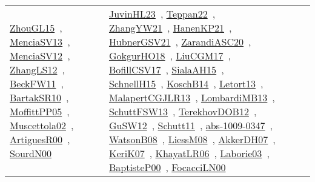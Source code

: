 {\begin{longtable}{lp{3cm}>{\raggedright\arraybackslash}p{6cm}>{\raggedright\arraybackslash}p{6cm}>{\raggedright\arraybackslash}p{8cm}}
\href{works/ZhouGL15.pdf}{ZhouGL15}~\cite{ZhouGL15}, \href{works/MenciaSV13.pdf}{MenciaSV13}~\cite{MenciaSV13}, \href{works/MenciaSV12.pdf}{MenciaSV12}~\cite{MenciaSV12}, \href{works/ZhangLS12.pdf}{ZhangLS12}~\cite{ZhangLS12}, \href{works/BeckFW11.pdf}{BeckFW11}~\cite{BeckFW11}, \href{works/BartakSR10.pdf}{BartakSR10}~\cite{BartakSR10}, \href{works/MoffittPP05.pdf}{MoffittPP05}~\cite{MoffittPP05}, \href{works/Muscettola02.pdf}{Muscettola02}~\cite{Muscettola02}, \href{works/ArtiguesR00.pdf}{ArtiguesR00}~\cite{ArtiguesR00}, \href{works/SourdN00.pdf}{SourdN00}~\cite{SourdN00} & \href{works/JuvinHL23.pdf}{JuvinHL23}~\cite{JuvinHL23}, \href{works/Teppan22.pdf}{Teppan22}~\cite{Teppan22}, \href{works/ZhangYW21.pdf}{ZhangYW21}~\cite{ZhangYW21}, \href{works/HanenKP21.pdf}{HanenKP21}~\cite{HanenKP21}, \href{works/HubnerGSV21.pdf}{HubnerGSV21}~\cite{HubnerGSV21}, \href{works/ZarandiASC20.pdf}{ZarandiASC20}~\cite{ZarandiASC20}, \href{works/GokgurHO18.pdf}{GokgurHO18}~\cite{GokgurHO18}, \href{works/LiuCGM17.pdf}{LiuCGM17}~\cite{LiuCGM17}, \href{works/BofillCSV17.pdf}{BofillCSV17}~\cite{BofillCSV17}, \href{works/SialaAH15.pdf}{SialaAH15}~\cite{SialaAH15}, \href{works/SchnellH15.pdf}{SchnellH15}~\cite{SchnellH15}, \href{works/KoschB14.pdf}{KoschB14}~\cite{KoschB14}, \href{works/Letort13.pdf}{Letort13}~\cite{Letort13}, \href{works/MalapertCGJLR13.pdf}{MalapertCGJLR13}~\cite{MalapertCGJLR13}, \href{works/LombardiMB13.pdf}{LombardiMB13}~\cite{LombardiMB13}, \href{works/SchuttFSW13.pdf}{SchuttFSW13}~\cite{SchuttFSW13}, \href{works/TerekhovDOB12.pdf}{TerekhovDOB12}~\cite{TerekhovDOB12}, \href{works/GuSW12.pdf}{GuSW12}~\cite{GuSW12}, \href{works/Schutt11.pdf}{Schutt11}~\cite{Schutt11}, \href{works/abs-1009-0347.pdf}{abs-1009-0347}~\cite{abs-1009-0347}, \href{works/WatsonB08.pdf}{WatsonB08}~\cite{WatsonB08}, \href{works/LiessM08.pdf}{LiessM08}~\cite{LiessM08}, \href{works/AkkerDH07.pdf}{AkkerDH07}~\cite{AkkerDH07}, \href{works/KeriK07.pdf}{KeriK07}~\cite{KeriK07}, \href{works/KhayatLR06.pdf}{KhayatLR06}~\cite{KhayatLR06}, \href{works/Laborie03.pdf}{Laborie03}~\cite{Laborie03}, \href{works/BaptisteP00.pdf}{BaptisteP00}~\cite{BaptisteP00}, \href{works/FocacciLN00.pdf}{FocacciLN00}~\cite{FocacciLN00}\\

\end{longtable}}
